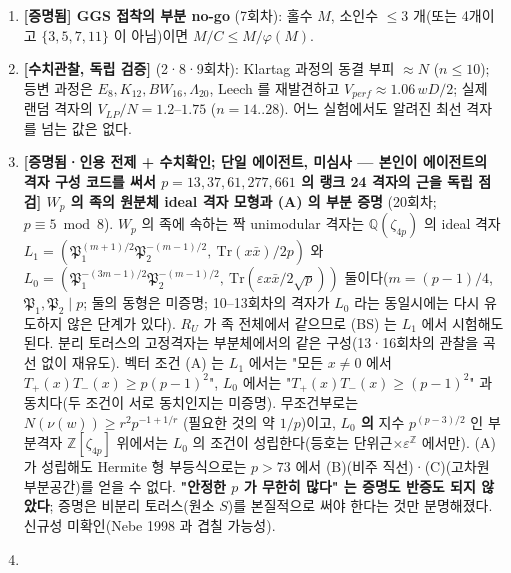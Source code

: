 \begin{enumerate}
\item
  \textbf{{[}증명됨{]} GGS 접착의 부분 no-go} (7회차): 홀수 \(M\), 소인수 \(\le3\) 개(또는 4개이고 \(\{3,5,7,11\}\) 이 아님)이면 \(M/C\le M/\varphi(M)\).
\item
  \textbf{{[}수치관찰, 독립 검증{]}} (2·8·9회차): Klartag 과정의 동결 부피 \(\approx N\) (\(n\le10\)); 등변 과정은 \(E_8,K_{12},BW_{16},\Lambda_{20}\), Leech 를 재발견하고 \(V_{perf}\approx1.06\,wD/2\); 실제 랜덤 격자의 \(V_{LP}/N=1.2\)--\(1.75\) (\(n=14..28\)). 어느 실험에서도 알려진 최선 격자를 넘는 값은 없다.
\item
  \textbf{{[}증명됨·인용 전제 + 수치확인; 단일 에이전트, 미심사 --- 본인이 에이전트의 격자 구성 코드를 써서 \(p=13,37,61,277,661\) 의 랭크 24 격자의 근을 독립 점검{]} \(W_p\) 의 족의 원분체 ideal 격자 모형과 (A) 의 부분 증명} (20회차; \(p\equiv5\bmod8\)). \(W_p\) 의 족에 속하는 짝 unimodular 격자는 \(\mathbb Q(\zeta_{4p})\) 의 ideal 격자 \(L_1=(\mathfrak P_1^{(m+1)/2}\mathfrak P_2^{-(m-1)/2},\ \mathrm{Tr}(x\bar x)/2p)\) 와 \(L_0=(\mathfrak P_1^{-(3m-1)/2}\mathfrak P_2^{-(m-1)/2},\ \mathrm{Tr}(\varepsilon x\bar x/2\sqrt p))\) 둘이다(\(m=(p-1)/4\), \(\mathfrak P_1,\mathfrak P_2\mid p\); 둘의 동형은 미증명; 10--13회차의 격자가 \(L_0\) 라는 동일시에는 다시 유도하지 않은 단계가 있다). \(R_U\) 가 족 전체에서 같으므로 (BS) 는 \(L_1\) 에서 시험해도 된다. 분리 토러스의 고정격자는 부분체에서의 같은 구성(13·16회차의 관찰을 곡선 없이 재유도). 벡터 조건 (A) 는 \(L_1\) 에서는 "모든 \(x\ne0\) 에서 \(T_+(x)T_-(x)\ge p(p-1)^2\)", \(L_0\) 에서는 "\(T_+(x)T_-(x)\ge(p-1)^2\)" 과 동치다(두 조건이 서로 동치인지는 미증명). 무조건부로는 \(N(\nu(w))\ge r^2p^{-1+1/r}\) (필요한 것의 약 \(1/p\))이고, \textbf{\(L_0\) 의} 지수 \(p^{(p-3)/2}\) 인 부분격자 \(\mathbb Z[\zeta_{4p}]\) 위에서는 \(L_0\) 의 조건이 성립한다(등호는 단위근\(\times\varepsilon^{\mathbb Z}\) 에서만). (A) 가 성립해도 Hermite 형 부등식으로는 \(p>73\) 에서 (B)(비주 직선)·(C)(고차원 부분공간)를 얻을 수 없다. \textbf{"안정한 \(p\) 가 무한히 많다" 는 증명도 반증도 되지 않았다}; 증명은 비분리 토러스(원소 \(S\))를 본질적으로 써야 한다는 것만 분명해졌다. 신규성 미확인(Nebe 1998 과 겹칠 가능성).
\item

\end{enumerate}
